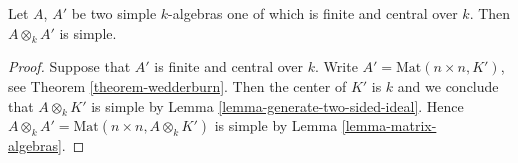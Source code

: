 \begin{lemma}
\label{lemma-tensor-simple}
Let $A$, $A'$ be two simple $k$-algebras one of which is finite and central
over $k$. Then $A \otimes_k A'$ is simple.
\end{lemma}

\begin{proof}
Suppose that $A'$ is finite and central over $k$.
Write $A' = \text{Mat}(n \times n, K')$, see
Theorem \ref{theorem-wedderburn}.
Then the center of $K'$ is $k$ and we conclude that
$A \otimes_k K'$ is simple by
Lemma \ref{lemma-generate-two-sided-ideal}.
Hence $A \otimes_k A' = \text{Mat}(n \times n, A \otimes_k K')$ is simple
by Lemma \ref{lemma-matrix-algebras}.
\end{proof}